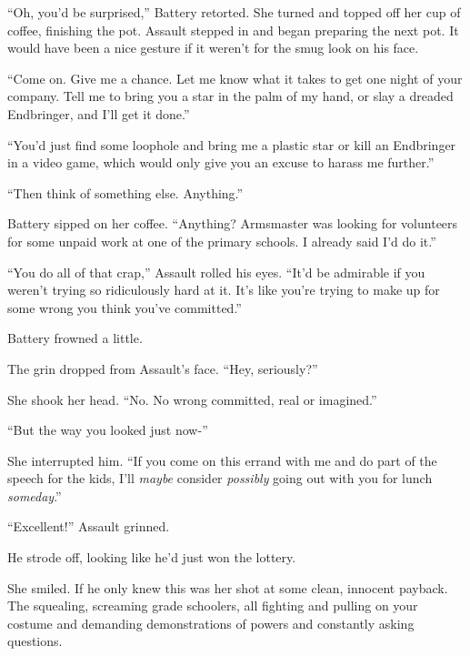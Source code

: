 ``Oh, you'd be surprised,'' Battery retorted.  She turned and topped off her cup of coffee, finishing the pot.  Assault stepped in and began preparing the next pot.  It would have been a nice gesture if it weren't for the smug look on his face.



``Come on.  Give me a chance.  Let me know what it takes to get one night of your company.  Tell me to bring you a star in the palm of my hand, or slay a dreaded Endbringer, and I'll get it done.''



``You'd just find some loophole and bring me a plastic star or kill an Endbringer in a video game, which would only give you an excuse to harass me further.''



``Then think of something else.  Anything.''



Battery sipped on her coffee.  ``Anything?  Armsmaster was looking for volunteers for some unpaid work at one of the primary schools.  I already said I'd do it.''



``You do all of that crap,'' Assault rolled his eyes.  ``It'd be admirable if you weren't trying so ridiculously hard at it.  It's like you're trying to make up for some wrong you think you've committed.''



Battery frowned a little.



The grin dropped from Assault's face.  ``Hey, seriously?''



She shook her head.  ``No.  No wrong committed, real or imagined.''



``But the way you looked just now-''



She interrupted him.  ``If you come on this errand with me and do part of the speech for the kids, I'll \emph{maybe} consider \emph{possibly} going out with you for lunch \emph{someday}.''



``Excellent!''  Assault grinned.



He strode off, looking like he'd just won the lottery.



She smiled.  If he only knew this was her shot at some clean, innocent payback.  The squealing, screaming grade schoolers, all fighting and pulling on your costume and demanding demonstrations of powers and constantly asking questions.



